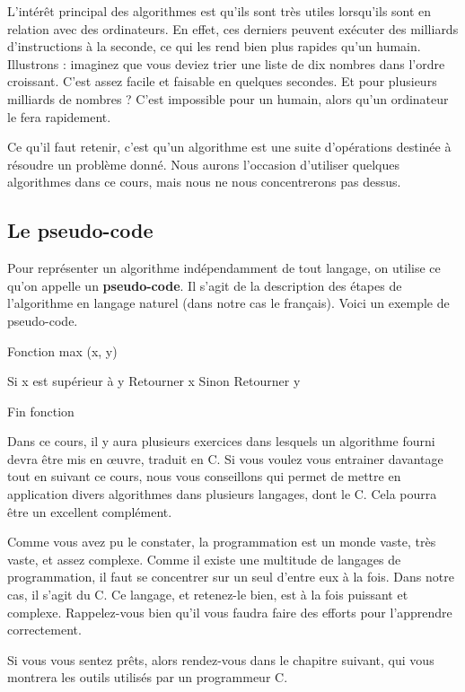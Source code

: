 L'intérêt principal des algorithmes est qu'ils sont très utiles
lorsqu'ils sont en relation avec des ordinateurs. En effet, ces
derniers peuvent exécuter des milliards d'instructions à la seconde,
ce qui les rend bien plus rapides qu'un humain. Illustrons : imaginez
que vous deviez trier une liste de dix nombres dans l'ordre
croissant. C'est assez facile et faisable en quelques secondes. Et
pour plusieurs milliards de nombres ? C'est impossible pour un humain,
alors qu'un ordinateur le fera rapidement.

Ce qu'il faut retenir, c'est qu'un algorithme est une suite
d'opérations destinée à résoudre un problème donné. Nous aurons
l'occasion d'utiliser quelques algorithmes dans ce cours, mais nous ne
nous concentrerons pas dessus.


\subsection{Le pseudo-code}
\label{le-pseudo-code}

Pour représenter un algorithme indépendamment de tout langage, on
utilise ce qu'on appelle un \textbf{pseudo-code}. Il s'agit de la
description des étapes de l'algorithme en langage naturel (dans notre
cas le français). Voici un exemple de pseudo-code.

\begin{C}
  Fonction max (x, y)
    
  Si x est supérieur à y Retourner x Sinon Retourner y

  Fin fonction
\end{C}

Dans ce cours, il y aura plusieurs exercices dans lesquels un
algorithme fourni devra être mis en œuvre, traduit en C. Si vous
voulez vous entrainer davantage tout en suivant ce cours, nous vous
conseillons  qui permet
de mettre en application divers algorithmes dans plusieurs langages,
dont le C. Cela pourra être un excellent complément.

\hrulefill

Comme vous avez pu le constater, la programmation est un monde vaste,
très vaste, et assez complexe. Comme il existe une multitude de
langages de programmation, il faut se concentrer sur un seul d'entre
eux à la fois. Dans notre cas, il s'agit du C. Ce langage, et
retenez-le bien, est à la fois puissant et complexe. Rappelez-vous
bien qu'il vous faudra faire des efforts pour l'apprendre
correctement.

Si vous vous sentez prêts, alors rendez-vous dans le chapitre suivant,
qui vous montrera les outils utilisés par un programmeur C.